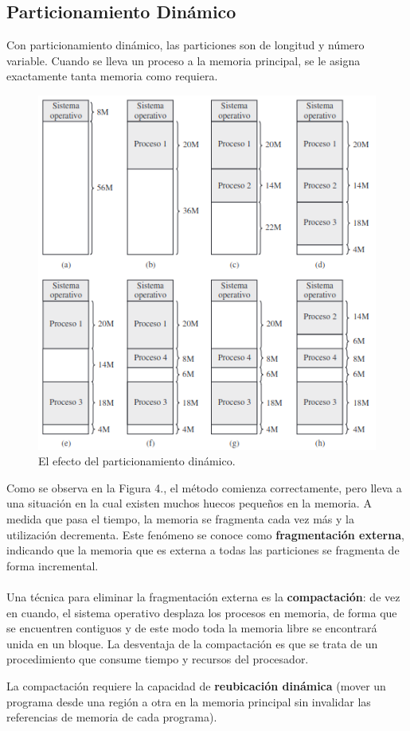 \documentclass[12pt,a4paper]{article}
\begin{document}
\subsection{Particionamiento Dinámico}
Con particionamiento dinámico, las particiones son de longitud y número variable. Cuando se lleva un proceso a la memoria principal, se le asigna exactamente tanta memoria como requiera.
\begin{figure}[H]
    \centering
    \includegraphics[width=12cm]{particiondinamica.png}\par
    \caption{El efecto del particionamiento dinámico.}
\end{figure}
Como se observa en la Figura 4., el método comienza correctamente, pero lleva a una situación en la cual existen muchos huecos pequeños en la memoria. A medida que pasa el tiempo, la memoria se fragmenta cada vez más y la utilización decrementa. Este fenómeno se conoce como \textbf{fragmentación externa}, indicando que la memoria que es externa a todas las particiones se fragmenta de forma incremental.\\\\ 
Una técnica para eliminar la fragmentación externa es la \textbf{compactación}: de vez en cuando, el sistema operativo desplaza los procesos en memoria, de forma que se encuentren contiguos y de este modo toda la memoria libre se encontrará unida en un bloque. La desventaja de la compactación es que se trata de un procedimiento que consume tiempo y recursos del procesador.
\begin{tcolorbox}[colback=cyan!10, colframe=blue!70, title=Nota]
    La compactación requiere la capacidad de \textbf{reubicación dinámica} (mover un programa desde una región a otra en la memoria principal sin invalidar las referencias de memoria de cada programa).
\end{tcolorbox}
\end{document}
